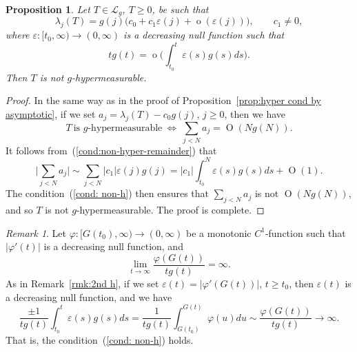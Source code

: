 \documentclass[10pt, a4paper]{amsart}
\newcommand{\sL}{\mathscr{L}}
\newcommand{\op}{\operatorname}
\numberwithin{equation}{section}
\newtheorem{proposition}[theorem]{Proposition}
\theoremstyle{definition}
\theoremstyle{remark}
\newtheorem{remark}[theorem]{Remark}
\begin{document}
\begin{proposition}\label{prop:Stronger-meas.Weyk-non-hyper}
 Let $T\in \sL_g$, $T\geq 0$, be such that
 \begin{equation}\label{cond:non-hyper-remainder}
 \lambda_j(T)=g(j)\big(c_0 + c_1 \varepsilon(j) +\op{o}\left( \varepsilon(j)\right)\big),  \qquad c_1\neq 0,
\end{equation}
where $\varepsilon:[t_0,\infty)\rightarrow (0,\infty)$ is a decreasing null function such that
\begin{equation}\label{cond: non-h}
tg(t)  =\op{o}\bigg( \int_{t_0}^t \varepsilon(s)g(s)ds\bigg).
\end{equation}
 Then $T$ is not $g$-hypermeasurable.
\end{proposition}
\begin{proof}
 In the same way as in the proof of Proposition~\ref{prop:hyper cond by asymptotic}, if we set $a_j=\lambda_j(T)-c_0g(j)$, $j\geq 0$, then we have
\begin{equation*}
 T\ \text{is $g$-hypermeasurable}\ \Longleftrightarrow \ \sum_{j<N} a_j=\op{O}\left(Ng(N)\right).
\end{equation*}
It follows from~(\ref{cond:non-hyper-remainder}) that
\begin{equation*}
\bigg| \sum_{j<N} a_j\bigg|  \sim  \sum_{j<N} |c_1|\varepsilon(j)g(j) =|c_1| \int_{t_0}^N \varepsilon(s)g(s)ds +\op{O}(1).
\end{equation*}
The condition~(\ref{cond: non-h}) then ensures that $ \sum_{j<N} a_j$ is not $\op{O}(Ng(N))$, and so $T$ is not $g$-hypermeasurable. The proof is complete.
\end{proof}

\begin{remark}\label{rmk:non-hyper}
 Let $\varphi:[G(t_0),\infty)\rightarrow (0,\infty)$ be a monotonic $C^1$-function such that $|\varphi'(t)|$ is a decreasing null function, and
 \begin{equation}\label{eq:non-hyper-condition}
\lim_{t\rightarrow \infty} \frac{ \varphi(G(t))}{tg(t)}=\infty.
\end{equation}
As in Remark~\ref{rmk:2nd h}, if we set $\varepsilon(t)=|\varphi'(G(t))|$, $t\geq t_0$, then $\varepsilon(t)$ is a decreasing null function, and we have
\begin{equation*}
 \frac{\pm 1}{tg(t)}\int_{t_0}^t \varepsilon(s)g(s)ds=   \frac{1}{tg(t)} \int_{G(t_0)}^{G(t)} \varphi(u)du\sim \frac{\varphi(G(t))}{tg(t)}\longrightarrow\infty.
\end{equation*}
That is, the condition~(\ref{cond: non-h}) holds.
 \end{remark}
\end{document}
